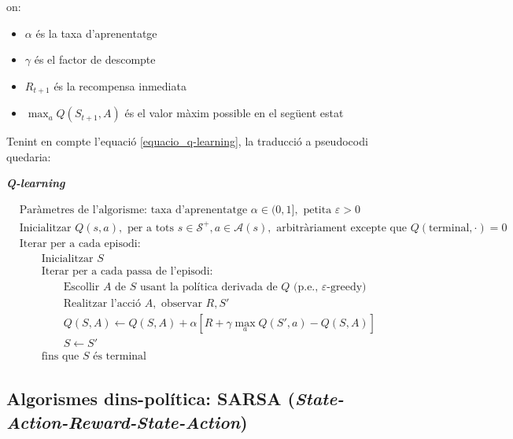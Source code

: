 \documentclass{article}
\begin{document}
on:
\begin{itemize}
    \item $\alpha$ és la taxa d'aprenentatge
    \item $\gamma$ és el factor de descompte
    \item $R_{t+1}$ és la recompensa inmediata
    \item $\max_{a} Q(S_{t+1},A)$ és el valor màxim possible en el següent estat
\end{itemize}
Tenint en compte l'equació \ref{equacio_q-learning}, la traducció a pseudocodi quedaria:
\begin{algorithm}[H]
\caption{\textit{\textbf{Q-learning}}}
\begin{align*}
& \text{Paràmetres de l'algorisme: taxa d'aprenentatge } \alpha \in (0,1], \text{ petita } \varepsilon > 0 \\
& \text{Inicialitzar } Q(s,a), \text{ per a tots } s \in \mathcal{S}^+, a \in \mathcal{A}(s), \text{ arbitràriament excepte que } Q(\text{terminal},\cdot) = 0 \\
& \text{Iterar per a cada episodi:} \\
& \qquad \text{Inicialitzar } S \\
& \qquad \text{Iterar per a cada passa de l'episodi:} \\
& \qquad \qquad \text{Escollir } A \text{ de } S \text{ usant la política derivada de } Q \text{ (p.e., }\varepsilon\text{-greedy)} \\
& \qquad \qquad \text{Realitzar l'acció } A, \text{ observar } R, S' \\
& \qquad \qquad Q(S,A) \leftarrow Q(S,A) + \alpha[R + \gamma \max_a Q(S',a) - Q(S,A)] \\
& \qquad \qquad S \leftarrow S' \\
& \qquad \text{fins que } S \text{ és terminal}
\end{align*}
\label{pseudocodi-q-learning}
\end{algorithm}
\subsection{Algorismes dins-política: SARSA (\textit{State-Action-Reward-State-Action})}
\end{document}
